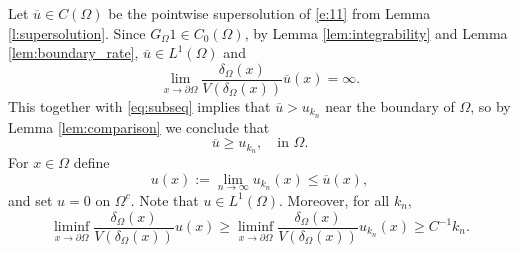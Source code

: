 \documentclass[a4paper,12pt,draft]{article}
\theoremstyle{plain}
\theoremstyle{definition}
\numberwithin{equation}{section}
\renewcommand{\le}{\leqslant}
\renewcommand{\ge}{\geqslant}
\newcommand{\1}{1}
\begin{document}
 Let $\overline{u}\in C(\Omega)$ be the pointwise supersolution of \eqref{e:11} from Lemma \ref{l:supersolution}. Since $G_\Omega 1\in C_0(\Omega)$, by Lemma \ref{lem:integrability} and Lemma \ref{lem:boundary_rate}, $\overline{u}\in L^1(\Omega)$ and 
\begin{equation}\label{e:boundary_supersolution}
    \lim_{x\to \partial\Omega}\frac{\delta_\Omega(x)}{V(\delta_\Omega(x))}\overline{u}(x)=\infty .
\end{equation}
This together with \eqref{eq:subseq} implies that $\overline{u}> u_{k_n}$ near the boundary of $\Omega$, so by Lemma \ref{lem:comparison} we conclude that 
\begin{equation}\label{e:u_k}
\overline{u}\ge u_{k_n},\quad  \text{in }\Omega.
\end{equation}
For $x\in \Omega$ define
$$
u(x):=\lim_{n\to \infty}u_{k_n}(x) \le \overline{u}(x),
$$
and set $u=0$ on $\Omega^c$. Note that $u\in L^1(\Omega)$. Moreover, for all $k_n$,
$$
\liminf_{x\to \partial\Omega}\frac{\delta_\Omega(x)}{V(\delta_\Omega(x))}u(x)\ge \liminf_{x\to \partial\Omega}\frac{\delta_\Omega(x)}{V(\delta_\Omega(x))}u_{k_n}(x)\ge C^{-1} k_n.
$$
\end{document}
